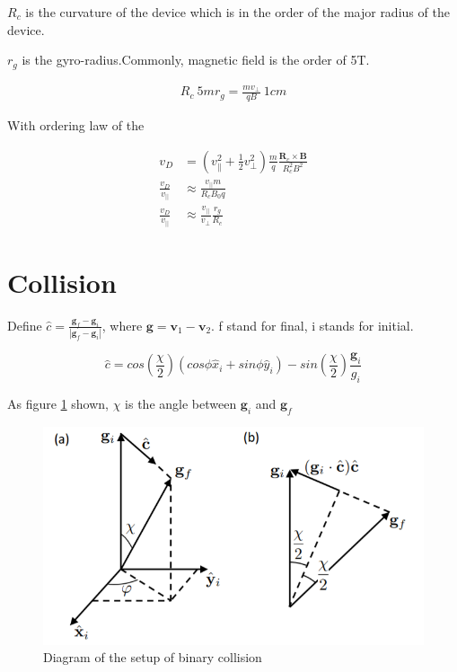 $R_c$ is the curvature of the device which is in the order of the major radius of the device. 

$r_g$ is the gyro-radius.Commonly, magnetic field is the order of 5T. 

\begin{equation}
    \begin{aligned}
    R_c ~ 5m
    r_g=\frac{mv_{\perp}}{qB} ~ 1cm
    \end{aligned}
\end{equation}

With ordering law of the 

\begin{equation}
\begin{aligned}
v_D{}&=\left(v_{ \|}^{2}+\frac{1}{2} v_{\perp}^{2}\right) \frac{m}{q} \frac{\mathbf{R}_{c} \times \mathbf{B}}{R_{c}^{2} B^{2}}\\
\frac{v_D}{v_{||}}&\approx \frac{v_{||} m}{R_cB_0q}\\
\frac{v_D}{v_{||}}&\approx \frac{v_{||}}{v_{\perp}}\frac{r_g}{R_c}
\label{eq:vD}
\end{aligned}
\end{equation}

\section{Collision\cite{coll}}\label{sec:coll}

Define $\hat{c}=\frac{\textbf{g}_f-\textbf{g}_i}{|\textbf{g}_f-\textbf{g}_i|}$, where $\textbf{g}=\textbf{v}_1-\textbf{v}_2$. f stand for final, i stands for initial. 

\begin{equation}
    \hat{c}=cos\left(\frac{\chi}{2}\right)(cos\phi \hat{x}_i+sin\phi \hat{y}_i)-sin\left(\frac{\chi}{2}\right)\frac{\textbf{g}_i}{g_i}
\end{equation}

As figure \ref{fig:coll1} shown, $\chi$ is the angle between $\textbf{g}_i$ and $\textbf{g}_f$

\begin{figure}[h] \centering
        \includegraphics[width=1\textwidth]{Image/coll1.PNG}
        \caption{Diagram of the setup of binary collision}
        \label{fig:coll1}
\end{figure}

